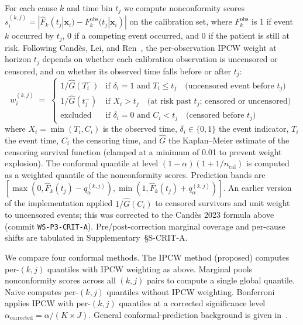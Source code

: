 \documentclass[11pt]{article}
\begin{document}
For each cause $k$ and time bin $t_j$ we compute nonconformity scores $s_i^{(k,j)} = |\widehat{F}_k(t_j | \mathbf{x}_i) - F_k^{\mathrm{obs}}(t_j | \mathbf{x}_i)|$ on the calibration set, where $F_k^{\mathrm{obs}}$ is 1 if event $k$ occurred by $t_j$, 0 if a competing event occurred, and 0 if the patient is still at risk. Following Cand\`{e}s, Lei, and Ren~\cite{candes2023conformal}, the per-observation IPCW weight at horizon $t_j$ depends on whether each calibration observation is uncensored or censored, and on whether its observed time falls before or after $t_j$:
\begin{equation}
w_i^{(k,j)} \;=\; \begin{cases}
1/\hat{G}(T_i^-) & \text{if } \delta_i = 1 \text{ and } T_i \leq t_j \quad\text{(uncensored event before }t_j\text{)} \\
1/\hat{G}(t_j^-) & \text{if } X_i > t_j \quad\text{(at risk past }t_j\text{; censored or uncensored)} \\
\text{excluded} & \text{if } \delta_i = 0 \text{ and } C_i < t_j \quad\text{(censored before }t_j\text{)}
\end{cases}
\end{equation}
where $X_i = \min(T_i, C_i)$ is the observed time, $\delta_i \in \{0,1\}$ the event indicator, $T_i$ the event time, $C_i$ the censoring time, and $\hat{G}$ the Kaplan--Meier estimate of the censoring survival function (clamped at a minimum of 0.01 to prevent weight explosion). The conformal quantile at level $(1-\alpha)(1 + 1/n_{\mathrm{cal}})$ is computed as a weighted quantile of the nonconformity scores. Prediction bands are $[\max(0, \widehat{F}_k(t_j) - q^{(k,j)}_\alpha), \min(1, \widehat{F}_k(t_j) + q^{(k,j)}_\alpha)]$. An earlier version of the implementation applied $1/\hat{G}(C_i)$ to censored survivors and unit weight to uncensored events; this was corrected to the Cand\`{e}s 2023 formula above (commit \texttt{WS-P3-CRIT-A}). Pre/post-correction marginal coverage and per-cause shifts are tabulated in Supplementary~\S S-CRIT-A.

We compare four conformal methods. The IPCW method (proposed) computes per-$(k,j)$ quantiles with IPCW weighting as above. Marginal pools nonconformity scores across all $(k,j)$ pairs to compute a single global quantile. Naive computes per-$(k,j)$ quantiles without IPCW weighting. Bonferroni applies IPCW with per-$(k,j)$ quantiles at a corrected significance level $\alpha_{\mathrm{corrected}} = \alpha/(K \times J)$. General conformal-prediction background is given in~\cite{vovk2022conformal,shafer2008tutorial,angelopoulos2021gentle}.
\end{document}
